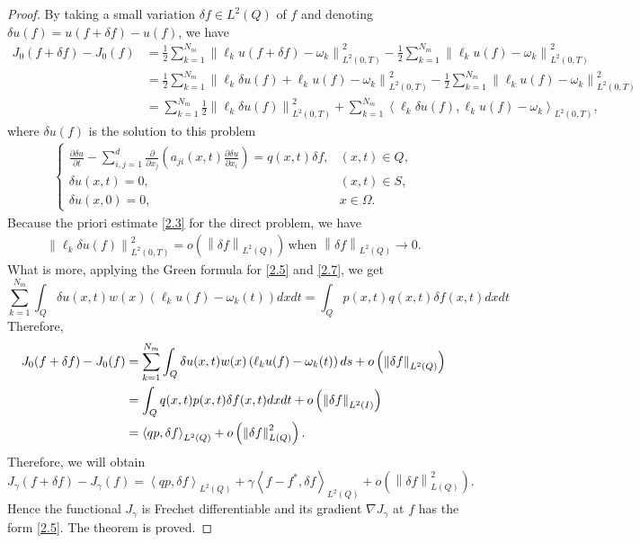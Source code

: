 \documentclass[]{article}
\begin{document}
\begin{proof}
	By taking a small variation $\delta f \in L^2(Q)$ of $f$ and denoting $\delta u(f)=u(f+\delta f)-u(f)$, we have
	\begin{align*}
		J_0(f+\delta f)-J_0(f)&=\frac{1}{2}\sum_{k=1}^{N_m}\left\|\ell_k u(f+\delta f)-\omega_k\right\|^2_{L^2(0, T)}-\frac{1}{2}\sum_{k=1}^{N_m}\left\|\ell_k u(f)-\omega_k\right\|^2_{L^2(0, T)}\\
		&=\frac{1}{2}\sum_{k=1}^{N_m}\left\|\ell_k \delta u(f) +\ell_k u(f)-\omega_k\right\|^2_{L^2(0, T)}-\frac{1}{2}\sum_{k=1}^{N_m}\left\|\ell_k u(f)-\omega_k\right\|^2_{L^2(0, T)}\\
		&=\sum_{k=1}^{N_m}\frac{1}{2}\left\|\ell_k \delta u(f)\right\|^2_{L^2(0, T)}+\sum_{k=1}^{N_m}\left\langle \ell_k \delta u(f), \ell_k u(f)-\omega_k\right\rangle_{L^2(0, T)},
	\end{align*}
	where $\delta u(f)$ is the solution to this problem
	\begin{align}\label{2.7}
		\begin{cases}
			\frac{\partial \delta u}{\partial t}-\sum\limits_{i, j=1}^{d}\frac{\partial}{\partial x_j}\left(a_{ji}(x, t)\frac{\partial \delta u}{\partial x_i}\right)=q(x, t)\delta f,&(x, t)\in Q,\\
			\delta u(x, t)=0, & (x, t)\in S,\\
			\delta u(x, 0)=0, &x\in \Omega.
		\end{cases}
	\end{align}
	Because the priori estimate \eqref{2.3} for the direct problem, we have
	\begin{align*}
		\left\|\ell_k\delta u(f)\right\|_{L^2(0, T)}^2=o\left(\left\|\delta f\right\|_{L^2(Q)}\right)\, \text{when } \left\|\delta f\right\|_{L^2(Q)}\to 0.
	\end{align*}
	What is more, applying the Green formula for \eqref{2.5} and \eqref{2.7}, we get
	$$\sum_{k=1}^{N_m}\int_{Q} \delta u(x, t) w(x) \left(\ell_k u(f)-\omega_k(t)\right)dxdt=\int_{Q} p(x, t)q(x, t)\delta f(x, t)dxdt$$
	Therefore,
	\begin{align*}
		J_0(f+\delta f)-J_0(f)&=\sum_{k=1}^{N_m}\int_{Q}\delta u(x, t)w(x)\left(\ell_k u(f)-\omega_k(t)\right)ds+o\left(\left\|\delta f\right\|_{L^2(Q)}\right)\notag\\
		&=\int_Q q(x, t)p(x, t)\delta f(x, t)dxdt+o\left(\left\|\delta f\right\|_{L^2(I)}\right)\notag\\
		&=\left\langle qp,\delta f \right\rangle_{L^2(Q)}+o\left(\left\|\delta f\right\|^2_{L(Q)}\right).
	\end{align*}
	Therefore, we will obtain
	$$J_\gamma(f+\delta f)-J_\gamma(f)=\left\langle qp,\delta f \right\rangle_{L^2(Q)}+\gamma\left\langle f-f^*,\delta f \right\rangle_{L^2(Q)}+o\left(\left\|\delta f\right\|^2_{L(Q)}\right).$$
	Hence the functional $J_\gamma$ is Frechet differentiable and its gradient $\nabla J_\gamma$ at $f$ has the form \eqref{2.5}. The theorem is proved.
\end{proof}
\end{document}
